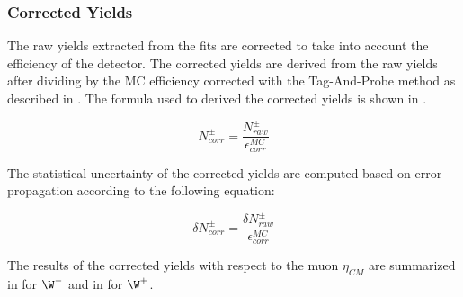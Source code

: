 \clearpage

\subsubsection{Corrected Yields}

The raw yields extracted from the fits are corrected to take into account the efficiency of the detector. The corrected yields are derived from the raw yields after dividing by the MC efficiency corrected with the Tag-And-Probe method as described in . The formula used to derived the corrected yields is shown in .

\begin{equation}
N^{\pm}_{corr} = \frac{N^{\pm}_{raw}}{\epsilon^{MC}_{corr}}
\label{eq:CorrectedYield}
\end{equation}

The statistical uncertainty of the corrected yields are computed based on error propagation according to the following equation:

\begin{equation}
\delta{N^{\pm}_{corr}} = \frac{\delta{N^{\pm}_{raw}}}{\epsilon^{MC}_{corr}}
\label{eq:CorrectedYieldStatError}
\end{equation}

The results of the corrected yields with respect to the muon $\eta_{CM}$ are summarized in  for $\W^{-}$ and in  for $\W^{+}$.



\clearpage

